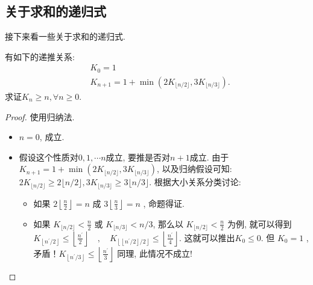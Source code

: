 \documentclass{ctexart}
\begin{document}
\subsection{关于求和的递归式}

接下来看一些关于求和的递归式. 

\begin{example}
    有如下的递推关系: 
    $$
\begin{aligned}
& K_0=1 \\
& K_{n+1}=1+\min \left(2 K_{\lfloor n / 2\rfloor}, 3 K_{\lfloor n / 3\rfloor}\right) .
\end{aligned}
$$
求证$K_n \geqslant n, \forall n \geqslant 0$. 
\end{example}

\begin{proof}
    使用归纳法. 
    \begin{itemize}
        \item $n=0$, 成立.
        \item 假设这个性质对$0,1, \cdots n$成立, 要推是否对$n+1$成立. 由于$K_{n+1}=1+\min \left(2 K_{\lfloor n / 2\rfloor}, 3 K_{\lfloor n / 3\rfloor}\right)$, 以及归纳假设可知: $2 K_{\lfloor n/ 2\rfloor} \geqslant 2\lfloor n / 2\rfloor, 3 K_{\lfloor n / 3\rfloor} \geqslant 3\lfloor n / 3\rfloor$. 根据大小关系分类讨论: 
        \begin{itemize}
            \item 如果 $2\left\lfloor\frac{n}{2}\right\rfloor=n$ 成 $3\left\lfloor\frac{n}{3}\right\rfloor=n$ , 命题得证. 
            \item 如果 $K_{\lfloor n / 2\rfloor}<\frac{n}{2}$ 或 $K_{\lfloor n / 3\rfloor}<n / 3$, 那么以 $K_{\lfloor n / 2\rfloor}<\frac{n}{2}$ 为例, 就可以得到$K_{\left\lfloor n^{\prime} / 2\right\rfloor} \leqslant\left\lfloor\frac{n^{\prime}}{2}\right\rfloor \quad, \quad K_{\left\lfloor\left\lfloor n^{\prime} / 2\right\rfloor / 2\right\rfloor} \leqslant\left\lfloor\frac{n^{\prime}}{4}\right\rfloor$. 这就可以推出$K_0 \leqslant 0$. 但 $K_0=1$ , 矛盾！$K_{\left\lfloor n^{\prime} / 3\right\rfloor} \leqslant\left\lfloor\frac{n^{\prime}}{3}\right\rfloor$ 同理, 此情况不成立!
        \end{itemize}
    \end{itemize}
\end{proof}
\end{document}
